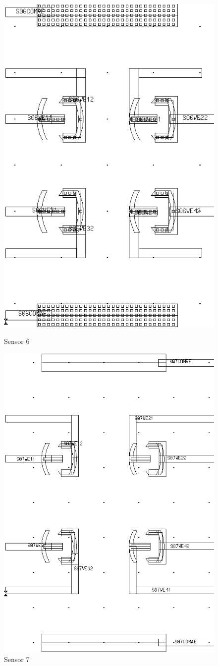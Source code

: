 \begin{description}
\begin{figure}
	\begin{minipage}{0.5\linewidth}
		\centering
		\includegraphics[width=0.6\linewidth]{figures/s06.png}
		\caption{Sensor 6}
		\label{s06}
	\end{minipage}
	\begin{minipage}{0.5\linewidth}
		\centering
		\includegraphics[width=0.6\linewidth]{figures/s07.png}
		\caption{Sensor 7}
		\label{s07}
	\end{minipage}
\end{figure}


\end{description}
